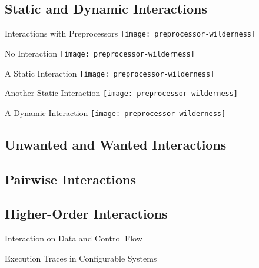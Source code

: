 \subsection{Static and Dynamic Interactions}
\begin{frame}{Interactions with Preprocessors}
	\centering
	\texttt{[image: preprocessor-wilderness]}
\end{frame}
\begin{frame}{No Interaction}
	\centering
	\texttt{[image: preprocessor-wilderness]}
\end{frame}
\begin{frame}{A Static Interaction}
	\centering
	\texttt{[image: preprocessor-wilderness]}
\end{frame}
\begin{frame}{Another Static Interaction}
	\centering
	\texttt{[image: preprocessor-wilderness]}
\end{frame}
\begin{frame}{A Dynamic Interaction}
	\centering
	\texttt{[image: preprocessor-wilderness]}
\end{frame}

\subsection{Unwanted and Wanted Interactions} %

\subsection{Pairwise Interactions}
\subsection{Higher-Order Interactions}

\begin{frame}{Interaction on Data and Control Flow \mytitlesource{\essentialconfigurationcomplexity}}
	\centering
\end{frame}
\begin{frame}{Execution Traces in Configurable Systems \mytitlesource{\essentialconfigurationcomplexity}}
\end{frame}



